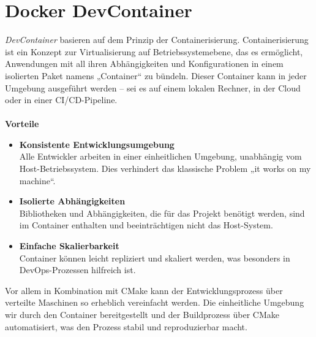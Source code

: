 \section{Docker DevContainer}
\label{sec:tooling-docker}
\textit{DevContainer} basieren auf dem Prinzip der Containerisierung.
Containerisierung ist ein Konzept zur Virtualisierung auf Betriebssystemebene, das es ermöglicht, Anwendungen mit all ihren Abhängigkeiten und Konfigurationen in einem isolierten Paket namens „Container“ zu bündeln.
Dieser Container kann in jeder Umgebung ausgeführt werden – sei es auf einem lokalen Rechner, in der Cloud oder in einer CI/CD-Pipeline. \cite{Docker2024}\\\\
\textbf{Vorteile}
\begin{itemize}
    \item \textbf{Konsistente Entwicklungsumgebung}\\
    Alle Entwickler arbeiten in einer einheitlichen Umgebung, unabhängig vom Host-Betriebssystem.
    Dies verhindert das klassische Problem „it works on my machine“.
    \item \textbf{Isolierte Abhängigkeiten}\\
    Bibliotheken und Abhängigkeiten, die für das Projekt benötigt werden, sind im Container enthalten und beeinträchtigen nicht das Host-System.
    \item \textbf{Einfache Skalierbarkeit}\\
    Container können leicht repliziert und skaliert werden, was besonders in DevOps-Prozessen hilfreich ist.
\end{itemize}
Vor allem in Kombination mit CMake kann der Entwicklungsprozess über verteilte Maschinen so erheblich vereinfacht werden.
Die einheitliche Umgebung wir durch den Container bereitgestellt und der Buildprozess über CMake automatisiert, was den Prozess stabil und reproduzierbar macht.


